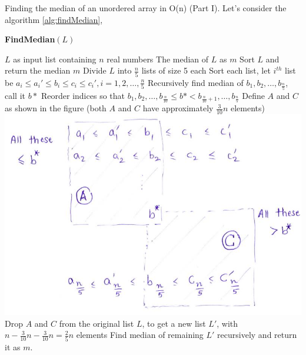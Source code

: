 \noindent {} Finding the median of an unordered array in O(n) (Part I). Let’s consider the algorithm \ref{alg:findMedian},

\begin{algorithm}
\caption{\textbf{FindMedian}$(L)$} \label{alg:findMedian}
\begin{algorithmic}
\Require $L$ as input list containing $n$ real numbers
\Ensure The median of $L$ as $m$
    \State Sort $L$ and return the median $m$
\EndIf
\State Divide $L$ into $\frac{n}{5}$ lists of size 5 each
\State Sort each list, let $i^{th}$ list be $a_i \leq a_i' \leq b_i \leq c_i \leq c_i', i = 1, 2, \dots, \frac{n}{5}$
\State Recursively find median of $b_1, b_2, \dots, b_\frac{n}{5}$, call it $b*$
\State Reorder indices so that $b_1, b_2, \dots, b_\frac{n}{10} \leq b* < b_{\frac{n}{10} + 1}, \dots, b_\frac{n}{5}$
\State Define $A$ and $C$ as shown in the figure (both $A$ and $C$ have approximately $\frac{3}{10} n$ elements)
\includegraphics[width=0.6\linewidth]{HWs/HW3/HW03_included.jpg}
\State Drop $A$ and $C$ from the original list $L$, to get a new list $L'$, with $n - \frac{3}{10}n - \frac{3}{10}n = \frac{2}{5}n $ elements
\State Find median of remaining $L'$ recursively and return it as $m$.
\end{algorithmic}
\end{algorithm}

